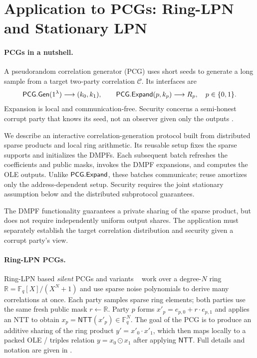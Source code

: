 \section{Application to PCGs: Ring-LPN and Stationary LPN}\label{sec:ringlpn}

\paragraph{PCGs in a nutshell.}
A pseudorandom correlation generator (PCG) uses short seeds to generate a
long sample from a target two-party correlation $\mathcal C$.
Its interfaces are
\[
 \mathsf{PCG}.\mathsf{Gen}(1^\lambda)\longrightarrow(k_0,k_1),\qquad
 \mathsf{PCG}.\mathsf{Expand}(p,k_p)\longrightarrow R_p,
 \quad p\in\{0,1\}.
\]
Expansion is local and communication-free. Security concerns a semi-honest
corrupt party that knows its seed, not an observer given only the outputs
\cite[Defs.~2.5--2.6]{boyle2020efficient}.

We describe an interactive correlation-generation protocol built from
distributed sparse products and local ring arithmetic.
Its reusable setup fixes the sparse supports and initializes the DMPFs.
Each subsequent batch refreshes the coefficients and public masks, invokes
the DMPF expansions, and computes the OLE outputs.
Unlike $\mathsf{PCG}.\mathsf{Expand}$, these batches communicate; reuse amortizes only
the address-dependent setup. Security requires the joint stationary
assumption below and the distributed subprotocol guarantees.

The DMPF functionality guarantees a private sharing of the sparse product,
but does not require independently uniform output shares. The application
must separately establish the target correlation distribution and security
given a corrupt party's view.





\iffull




\else
\paragraph{Ring-LPN PCGs.}
Ring-LPN based \emph{silent} PCGs \cite{boyle2020efficient} and variants ~\cite{pcgQASD,foleage,anyField,pcgZ2k} work over a degree-$N$ ring $\mathbb{R}=\mathbb{F}_q[X]/(X^N+1)$ and use sparse noise
polynomials to derive many correlations at once. Each party samples sparse ring elements; both parties use the same fresh public mask
$r\leftarrow \mathbb{R}$. Party $p$ forms $x'_p=e_{p,0}+r\cdot e_{p,1}$ and applies an NTT to obtain
$x_p=\mathsf{NTT}(x'_p)\in \mathbb{F}_q^N$. The goal of the PCG is to produce an additive sharing of the ring product
$y'=x'_0\cdot x'_1$, which then maps locally to a packed OLE / triples relation $y=x_0\odot x_1$
after applying $\mathsf{NTT}$. Full details and notation are given in .%

